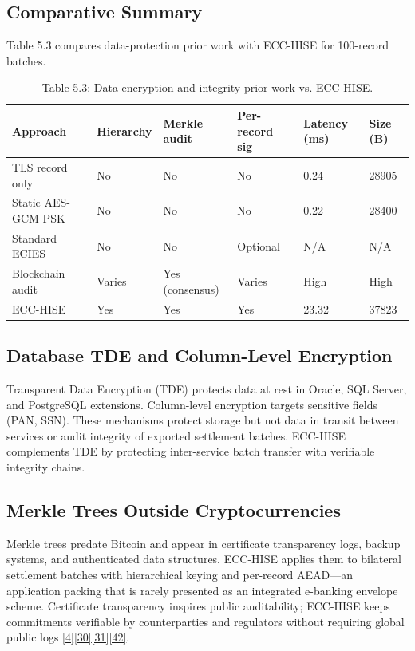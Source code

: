 \subsection{Comparative Summary}

\indent Table 5.3 compares data-protection prior work with ECC-HISE for 100-record batches.

\begin{table}[htbp]
\centering
\begin{tabular}{llllll}
\toprule
Approach & Hierarchy & Merkle audit & Per-record sig & Latency (ms) & Size (B) \\
\midrule
TLS record only & No & No & No & 0.24 & 28905 \\
Static AES-GCM PSK & No & No & No & 0.22 & 28400 \\
Standard ECIES & No & No & Optional & N/A & N/A \\
Blockchain audit & Varies & Yes (consensus) & Varies & High & High \\
ECC-HISE & Yes & Yes & Yes & 23.32 & 37823 \\
\bottomrule
\end{tabular}
\caption{Table 5.3: Data encryption and integrity prior work vs. ECC-HISE.}\label{tbl:5.3}
\end{table}
\subsection{Database TDE and Column-Level Encryption}

\indent Transparent Data Encryption (TDE) protects data at rest in Oracle, SQL Server, and PostgreSQL extensions. Column-level encryption targets sensitive fields (PAN, SSN). These mechanisms protect storage but not data in transit between services or audit integrity of exported settlement batches. ECC-HISE complements TDE by protecting inter-service batch transfer with verifiable integrity chains.

\subsection{Merkle Trees Outside Cryptocurrencies}

\indent Merkle trees predate Bitcoin and appear in certificate transparency logs, backup systems, and authenticated data structures. ECC-HISE applies them to bilateral settlement batches with hierarchical keying and per-record AEAD---an application packing that is rarely presented as an integrated e-banking envelope scheme. Certificate transparency inspires public auditability; ECC-HISE keeps commitments verifiable by counterparties and regulators without requiring global public logs \hyperref[ref:4]{[4]}\hyperref[ref:30]{[30]}\hyperref[ref:31]{[31]}\hyperref[ref:42]{[42]}.

